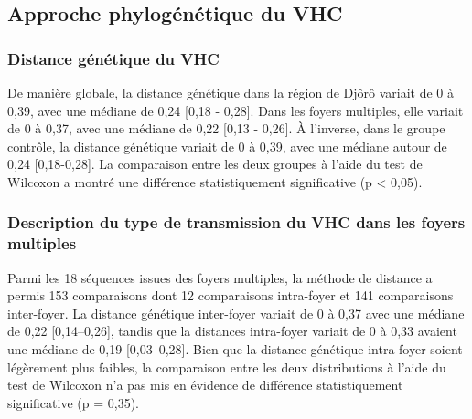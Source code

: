 \documentclass[a4paper,12pt]{article}
\begin{document}
\subsection{Approche phylogénétique du VHC}

\subsubsection{Distance génétique du VHC}

De manière globale, la distance génétique dans la région de Djôrô variait de 0 à 0,39, avec une médiane de 0,24 [0,18 - 0,28]. Dans les foyers multiples, elle variait de 0 à 0,37, avec une médiane de 0,22 [0,13 - 0,26]. À l’inverse, dans le groupe contrôle, la distance génétique variait de 0 à 0,39, avec une médiane autour de 0,24 [0,18-0,28]. La comparaison entre les deux groupes à l’aide du test de Wilcoxon a montré une différence statistiquement significative (p < 0,05). 

\subsubsection{Description du type de transmission du VHC dans les foyers multiples}

Parmi les 18 séquences issues des foyers multiples, la méthode de distance a permis 153 comparaisons dont 12 comparaisons intra-foyer et 141 comparaisons inter-foyer. La distance génétique inter-foyer variait de 0 à 0,37 avec une médiane de 0,22 [0,14–0,26], tandis que la distances intra-foyer variait de 0 à 0,33 avaient une médiane de 0,19 [0,03–0,28]. Bien que la distance génétique intra-foyer soient légèrement plus faibles, la comparaison entre les deux distributions à l’aide du test de Wilcoxon n’a pas mis en  évidence de différence statistiquement significative (p = 0,35). 

\end{document}

